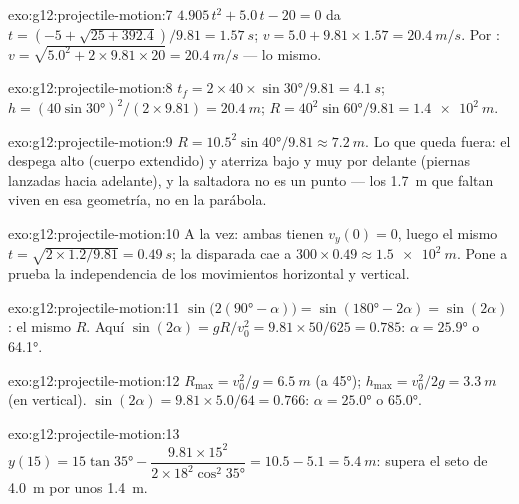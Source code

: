 \begin{solution}{exo:g12:projectile-motion:7}
$4.905\,t^2 + 5.0\,t - 20 = 0$ da
$t = (-5 + \sqrt{25 + 392.4})/9.81 = \qty{1.57}{s}$;
$v = 5.0 + 9.81 \times 1.57 = \qty{20.4}{m/s}$. Por :
$v = \sqrt{5.0^2 + 2 \times 9.81 \times 20} = \qty{20.4}{m/s}$ --- lo
mismo.
\end{solution}

\begin{solution}{exo:g12:projectile-motion:8}
$t_f = 2 \times 40 \times \sin\ang{30}/9.81 = \qty{4.1}{s}$;
$h = (40\sin\ang{30})^2/(2 \times 9.81) = \qty{20.4}{m}$;
$R = 40^2 \sin\ang{60}/9.81 = \qty{1.4e2}{m}$.
\end{solution}

\begin{solution}{exo:g12:projectile-motion:9}
$R = 10.5^2\sin\ang{40}/9.81 \approx \qty{7.2}{m}$. Lo que queda fuera:
el  despega alto (cuerpo extendido) y aterriza bajo y muy
por delante (piernas lanzadas hacia adelante), y la saltadora no es un
punto --- los \qty{1.7}{m} que faltan viven en esa geometría, no en la
parábola.
\end{solution}

\begin{solution}{exo:g12:projectile-motion:10}
A la vez: ambas tienen $v_y(0) = 0$, luego el mismo
$t = \sqrt{2 \times 1.2/9.81} = \qty{0.49}{s}$; la disparada cae a
$300 \times 0.49 \approx \qty{1.5e2}{m}$. Pone a prueba la independencia
de los movimientos horizontal y vertical.
\end{solution}

\begin{solution}{exo:g12:projectile-motion:11}
$\sin\bigl(2(\ang{90}-\alpha)\bigr) = \sin(\ang{180}-2\alpha) =
\sin(2\alpha)$: el mismo $R$. Aquí
$\sin(2\alpha) = gR/v_0^2 = 9.81 \times 50/625 = 0.785$:
$\alpha = \ang{25.9}$ o \ang{64.1}.
\end{solution}

\begin{solution}{exo:g12:projectile-motion:12}
$R_{\max} = v_0^2/g = \qty{6.5}{m}$ (a \ang{45});
$h_{\max} = v_0^2/2g = \qty{3.3}{m}$ (en vertical).
$\sin(2\alpha) = 9.81 \times 5.0/64 = 0.766$: $\alpha = \ang{25.0}$ o
\ang{65.0}.
\end{solution}

\begin{solution}{exo:g12:projectile-motion:13}
$y(15) = 15\tan\ang{35} - \dfrac{9.81 \times 15^2}
{2 \times 18^2 \cos^2\ang{35}} = 10.5 - 5.1 = \qty{5.4}{m}$: supera el
seto de \qty{4.0}{m} por unos \qty{1.4}{m}.
\end{solution}

